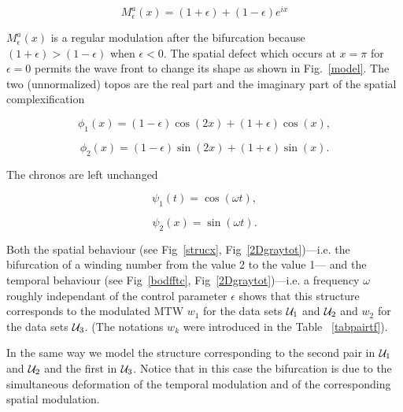 \begin{equation}
M^a_{\epsilon}(x)=(1+\epsilon)+(1-\epsilon)e^{ix}
\end{equation}

$M^a_{\epsilon}(x)$ is a regular modulation after the bifurcation
because $(1+\epsilon)>(1-\epsilon)$ when $\epsilon<0$.
The spatial defect which occurs at $x=\pi$ for 
$\epsilon=0$ permits the wave front to change its 
shape as shown in  Fig.~\ref{model}.
The two (unnormalized) topos are the real part and the imaginary 
part of the spatial complexification 


\begin{equation}
\phi_1(x)=(1-\epsilon)\cos(2x)+(1+\epsilon)\cos(x),
\end{equation}

\begin{equation}
\phi_2(x)=(1-\epsilon)\sin(2x)+(1+\epsilon)\sin(x).
\end{equation}

The chronos are left unchanged 


\begin{equation}
\psi_1(t)=\cos(\omega t),
\end{equation}

\begin{equation}
\psi_2(x)=\sin(\omega t).
\end{equation}


Both the spatial behaviour (see Fig~\ref{strucx}, 
Fig~\ref{2Dgraytot})---i.e. the bifurcation of a winding number
from the value 2 to the value 1--- and the temporal behaviour 
(see  Fig~\ref{bodfftc}, Fig~\ref{2Dgraytot})---i.e.
a frequency $\omega$ roughly independant of the control parameter
$\epsilon$ shows that this structure corresponds to the modulated MTW
$w_1$ for the data sets ${\cal U}_1$ and ${\cal U}_2$ and
$w_2$ for the data sets ${\cal U}_3$.
(The notations $w_k$ were introduced in the Table ~\ref{tabpairtf}).

\medskip

In the same way we model the structure corresponding to the
second pair in ${\cal U}_1$ and ${\cal U}_2$ and the first in 
${\cal U}_3$. Notice that in this case the bifurcation is due to
the simultaneous deformation of the temporal modulation and of
the corresponding spatial modulation.

\medskip

